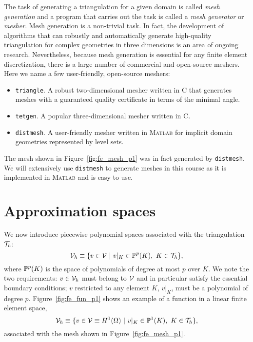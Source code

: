The task of generating a triangulation for a given domain is called \emph{mesh generation} and a program that carries out the task is called a \emph{mesh generator} or \emph{mesher}.  Mesh generation is a non-trivial task.  In fact, the development of algorithms that can robustly and automatically generate high-quality triangulation for complex geometries in three dimensions is an area of ongoing research.  Nevertheless, because mesh generation is essential for any finite element discretization, there is a large number of commercial and open-source meshers.  Here we name a few user-friendly, open-source meshers:
\begin{itemize}
\item \texttt{triangle}. A robust two-dimensional mesher written in C that generates meshes with a guaranteed quality certificate in terms of the minimal angle.
\item \texttt{tetgen}. A popular three-dimensional mesher written in C.
\item \texttt{distmesh}.  A user-friendly mesher written in \textsc{Matlab} for implicit domain geometries represented by level sets. 
\end{itemize}
The mesh shown in Figure~\ref{fig:fe_mesh_p1} was in fact generated by \texttt{distmesh}.  We will extensively use \texttt{distmesh} to generate meshes in this course as it is implemented in \textsc{Matlab} and is easy to use.


\section{Approximation spaces}
We now introduce piecewise polynomial spaces associated with the triangulation $\mathcal{T}_h$:
\begin{equation*}
  \mathcal{V}_h \equiv \{ v \in \mathcal{V} \ | \ v|_K \in \mathbb{P}^p(K), \ K \in \mathcal{T}_h \},
  \label{eq:fe_Vh}
\end{equation*}
where $\mathbb{P}^p(K)$ is the space of polynomials of degree at most $p$ over $K$.  We note the two requirements: $v \in \mathcal{V}_h$ must belong to $\mathcal{V}$ and in particular satisfy the essential boundary conditions; $v$ restricted to any element $K$, $v|_K$, must be a polynomial of degree $p$. Figure~\ref{fig:fe_fun_p1} shows an example of a function in a linear finite element space,
\begin{equation*}
  \mathcal{V}_h \equiv \{ v \in \mathcal{V} \equiv H^1(\Omega) \ | \ v|_K \in \mathbb{P}^1(K), \ K \in \mathcal{T}_h \},
  \label{eq:fe_lin_Vh}
\end{equation*}
associated with the mesh shown in Figure~\ref{fig:fe_mesh_p1}.

